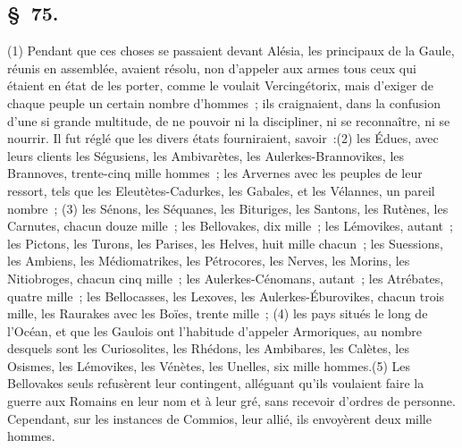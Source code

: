 \documentclass[french,twoside]{book} %
\begin{document}
\subsection[{§ 75.}]{ \textsc{§ 75.} }
\noindent (1) Pendant que ces choses se passaient devant Alésia, les principaux de la Gaule, réunis en assemblée, avaient résolu, non d’appeler aux armes tous ceux qui étaient en état de les porter, comme le voulait Vercingétorix, mais d’exiger de chaque peuple un certain nombre d’hommes ; ils craignaient, dans la confusion d’une si grande multitude, de ne pouvoir ni la discipliner, ni se reconnaître, ni se nourrir. Il fut réglé que les divers états fourniraient, savoir :(2) les Édues, avec leurs clients les Ségusiens, les Ambivarètes, les Aulerkes-Brannovikes, les Brannoves, trente-cinq mille hommes ; les Arvernes avec les peuples de leur ressort, tels que les Eleutètes-Cadurkes, les Gabales, et les Vélannes, un pareil nombre ; (3) les Sénons, les Séquanes, les Bituriges, les Santons, les Rutènes, les Carnutes, chacun douze mille ; les Bellovakes, dix mille ; les Lémovikes, autant ; les Pictons, les Turons, les Parises, les Helves, huit mille chacun ; les Suessions, les Ambiens, les Médiomatrikes, les Pétrocores, les Nerves, les Morins, les Nitiobroges, chacun cinq mille ; les Aulerkes-Cénomans, autant ; les Atrébates, quatre mille ; les Bellocasses, les Lexoves, les Aulerkes-Éburovikes, chacun trois mille, les Raurakes avec les Boïes, trente mille ; (4) les pays situés le long de l’Océan, et que les Gaulois ont l’habitude d’appeler Armoriques, au nombre desquels sont les Curiosolites, les Rhédons, les Ambibares, les Calètes, les Osismes, les Lémovikes, les Vénètes, les Unelles, six mille hommes.(5) Les Bellovakes seuls refusèrent leur contingent, alléguant qu’ils voulaient faire la guerre aux Romains en leur nom et à leur gré, sans recevoir d’ordres de personne. Cependant, sur les instances de Commios, leur allié, ils envoyèrent deux mille hommes.
\end{document}

